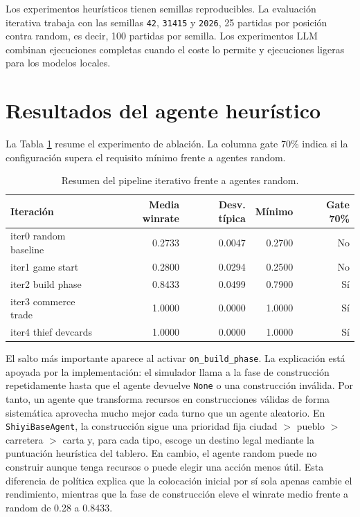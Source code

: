 ﻿\documentclass[10pt,a4paper]{article}
\begin{document}
Los experimentos heurísticos tienen semillas reproducibles. La evaluación iterativa trabaja con las semillas \texttt{42}, \texttt{31415} y \texttt{2026}, 25 partidas por posición contra random, es decir, 100 partidas por semilla. Los experimentos LLM combinan ejecuciones completas cuando el coste lo permite y ejecuciones ligeras para los modelos locales.

\section{Resultados del agente heurístico}
La Tabla \ref{tab:iterativo} resume el experimento de ablación. La columna gate 70\% indica si la configuración supera el requisito mínimo frente a agentes random.

\begin{table}[H]
\centering
\small
\begin{tabular}{lrrrr}
\toprule
Iteración & Media winrate & Desv. típica & Mínimo & Gate 70\% \\
\midrule
iter0 random baseline & 0.2733 & 0.0047 & 0.2700 & No \\
iter1 game start & 0.2800 & 0.0294 & 0.2500 & No \\
iter2 build phase & 0.8433 & 0.0499 & 0.7900 & Sí \\
iter3 commerce trade & 1.0000 & 0.0000 & 1.0000 & Sí \\
iter4 thief devcards & 1.0000 & 0.0000 & 1.0000 & Sí \\
\bottomrule
\end{tabular}
\caption{Resumen del pipeline iterativo frente a agentes random.}
\label{tab:iterativo}
\end{table}

El salto más importante aparece al activar \texttt{on\_build\_phase}. La explicación está apoyada por la implementación: el simulador llama a la fase de construcción repetidamente hasta que el agente devuelve \texttt{None} o una construcción inválida. Por tanto, un agente que transforma recursos en construcciones válidas de forma sistemática aprovecha mucho mejor cada turno que un agente aleatorio. En \texttt{ShiyiBaseAgent}, la construcción sigue una prioridad fija ciudad $>$ pueblo $>$ carretera $>$ carta y, para cada tipo, escoge un destino legal mediante la puntuación heurística del tablero. En cambio, el agente random puede no construir aunque tenga recursos o puede elegir una acción menos útil. Esta diferencia de política explica que la colocación inicial por sí sola apenas cambie el rendimiento, mientras que la fase de construcción eleve el winrate medio frente a random de 0.28 a 0.8433.
\end{document}
